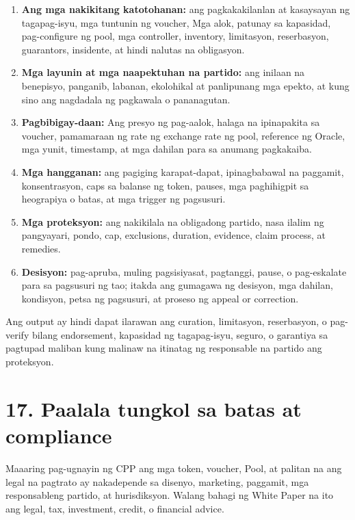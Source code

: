 \documentclass[11pt]{article}
\begin{document}
\begin{enumerate}[leftmargin=*]
\item \textbf{Ang mga nakikitang katotohanan:} ang pagkakakilanlan at kasaysayan ng tagapag-isyu, mga tuntunin ng voucher, Mga alok, patunay sa kapasidad, pag-configure ng pool, mga controller, inventory, limitasyon, reserbasyon, guarantors, insidente, at hindi nalutas na obligasyon.
\item \textbf{Mga layunin at mga naapektuhan na partido:} ang inilaan na benepisyo, panganib, labanan, ekolohikal at panlipunang mga epekto, at kung sino ang nagdadala ng pagkawala o pananagutan.
\item \textbf{Pagbibigay-daan:} Ang presyo ng pag-aalok, halaga na ipinapakita sa voucher, pamamaraan ng rate ng exchange rate ng pool, reference ng Oracle, mga yunit, timestamp, at mga dahilan para sa anumang pagkakaiba.
\item \textbf{Mga hangganan:} ang pagiging karapat-dapat, ipinagbabawal na paggamit, konsentrasyon, caps sa balanse ng token, pauses, mga paghihigpit sa heograpiya o batas, at mga trigger ng pagsusuri.
\item \textbf{Mga proteksyon:} ang nakikilala na obligadong partido, nasa ilalim ng pangyayari, pondo, cap, exclusions, duration, evidence, claim process, at remedies.
\item \textbf{Desisyon:} pag-apruba, muling pagsisiyasat, pagtanggi, pause, o pag-eskalate para sa pagsusuri ng tao; itakda ang gumagawa ng desisyon, mga dahilan, kondisyon, petsa ng pagsusuri, at proseso ng appeal or correction.
\end{enumerate}
Ang output ay hindi dapat ilarawan ang curation, limitasyon, reserbasyon, o pag-verify bilang endorsement, kapasidad ng tagapag-isyu, seguro, o garantiya sa pagtupad maliban kung malinaw na itinatag ng responsable na partido ang proteksyon.


\section*{17. Paalala tungkol sa batas at compliance}

Maaaring pag-ugnayin ng CPP ang mga token, voucher, Pool, at palitan na ang legal na pagtrato ay nakadepende sa disenyo, marketing, paggamit, mga responsableng partido, at hurisdiksyon. Walang bahagi ng White Paper na ito ang legal, tax, investment, credit, o financial advice.
\end{document}

